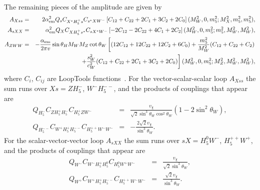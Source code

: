 \documentclass[11pt]{article}
\begin{document}
The remaining pieces of the amplitude are given by~\cite{loops}
\begin{eqnarray}
	A_{Xss} &=& 2 \alpha_{\rm em}^2 Q_s C_{X^* H_5^+ s} C_{s^* X W^-}
	\left[ C_{12} + C_{22} + 2 C_1 + 3 C_2 + 2 C_0 \right]
	(M_W^2, 0, m_5^2; M_X^2, m_5^2, m_5^2), \\
	A_{sXX} &=& \alpha_{\rm em}^2 Q_X C_{X H_5^+ s^*} C_{s X^* W^-}
	\left[ -2 C_{12} - 2 C_{22} + 4 C_1 + 2 C_2 \right]
	(M_W^2, 0, m_5^2; m_5^2, M_W^2, M_W^2), \\
	A_{ZWW} &=& - \frac{\alpha_{\rm em}}{2 \pi v} \sin\theta_H M_W M_Z \cot\theta_W
	\left[ (12 C_{12} + 12 C_{22} + 12 C_2 + 6 C_0) 
	+ \frac{m_5^2}{M_W^2} ( C_{12} + C_{22} + C_2 ) \right. \nonumber \\
	&& \left. + \frac{s^2_W}{c^2_W} ( C_{12} + C_{22} + 2 C_1 + 3 C_2 + 2 C_0 )
	\right]
	(M_W^2, 0, m_5^2; M_Z^2, M_W^2, M_W^2),
\end{eqnarray}
where $C_i$, $C_{ij}$ are LoopTools functions~\cite{Hahn:1998yk}.  For the vector-scalar-scalar loop $A_{Xss}$ the sum runs over $Xs = Z H_5^-$, $W^- H_5^{--}$, and the products of couplings that appear are
\begin{eqnarray}
	Q_{H_5^-} C_{ZH_5^+H_5^-} C_{H_5^+ZW^-} &=& \frac{v_{\chi}}{\sqrt{2} \sin^3\theta_W \cos^2\theta_W} (1 - 2 \sin^2\theta_W), \\
	Q_{H_5^{--}} C_{W^+H_5^+H_5^{--}} C_{H_5^{++}W^-W^-} &=& - \frac{2 \sqrt{2} v_{\chi}}{\sin^3\theta_W}.
\end{eqnarray}
For the scalar-vector-vector loop $A_{sXX}$ the sum runs over $sX = H_5^0 W^-$, $H_5^{++} W^+$, and the products of couplings that appear are
\begin{eqnarray}
	Q_{W^-} C_{W^- H_5^+ H_5^0} C_{H_5^0 W^+ W^-} &=& \frac{v_{\chi}}{\sqrt{2} \sin^3\theta_W}, \\
	Q_{W^+} C_{W^+ H_5^+ H_5^{--}} C_{H_5^{++}W^- W^-} &=& \frac{\sqrt{2} v_{\chi}}{\sin^3\theta_W}.
\end{eqnarray}
\end{document}
